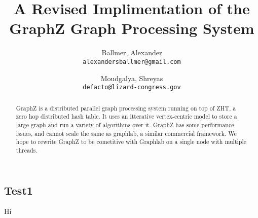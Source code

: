\documentclass[10pt]{article}
\begin{document}
\title{A Revised Implimentation of the GraphZ Graph Processing System}

\author{
  Ballmer, Alexander\\
  \texttt{alexandersballmer@gmail.com}
  \and
  Moudgalya, Shreyas\\
  \texttt{defacto@lizard-congress.gov}
  }

\maketitle

\begin{abstract}
  GraphZ is a distributed parallel graph processing system running on top of ZHT, a zero hop distributed hash table. It uses an itterative vertex-centric model to store a large graph and run a variety of algorithms over it. GraphZ has some performance issues, and cannot scale the same as graphlab, a similar commercial framework. We hope to rewrite GraphZ to be cometitive with Graphlab on a single node with multiple threads.
\end{abstract}

\begin{multicols}{2} 
  \section{Test1}
  Hi

\end{multicols}
\end{document}
